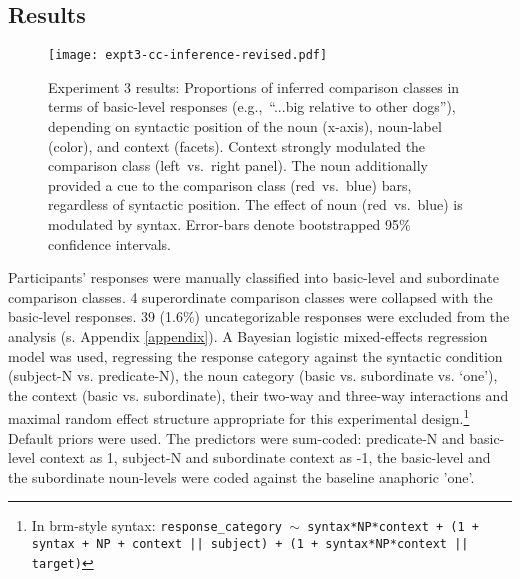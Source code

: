 \subsection{Results}
\label{cci-results-text}
\begin{figure*}[t]
	\begin{center}
		\texttt{[image: expt3-cc-inference-revised.pdf]}
	\end{center}
	\vspace{-0.3cm}
	\caption{Experiment 3 results: Proportions of inferred comparison classes in terms of basic-level responses (e.g.,~“...big relative to other dogs”), depending on syntactic position of the noun (x-axis), noun-label (color), and context (facets).
		Context strongly modulated the comparison class (left~vs.~right panel). 
		The noun additionally provided a cue to the comparison class (red~vs.~blue) bars, regardless of syntactic position. 
		The effect of noun (red~vs.~blue) is modulated by syntax. 
		Error-bars denote bootstrapped 95\% confidence intervals.}
	\label{cci-results}
\end{figure*}
Participants’ responses were manually classified into basic-level and subordinate comparison classes. 4 superordinate comparison classes were collapsed with the basic-level responses. 39 (1.6\%) uncategorizable responses were excluded from the analysis (s. Appendix \ref{appendix}). 
A Bayesian logistic mixed-effects regression model was used, regressing the response category against the syntactic condition (subject-N vs. predicate-N), the noun category (basic vs. subordinate vs. ‘one’), the context (basic vs. subordinate), their two-way and three-way interactions and maximal random effect structure appropriate for this experimental design.\footnote{In brm-style syntax: \texttt{response\_category $\sim$ syntax*NP*context + (1 + syntax + NP + context || subject) + (1 + syntax*NP*context || target)}} Default priors were used.
The predictors were sum-coded: predicate-N and basic-level context as 1, subject-N and subordinate context as -1, the basic-level and the subordinate noun-levels were coded against the baseline anaphoric 'one'. 

